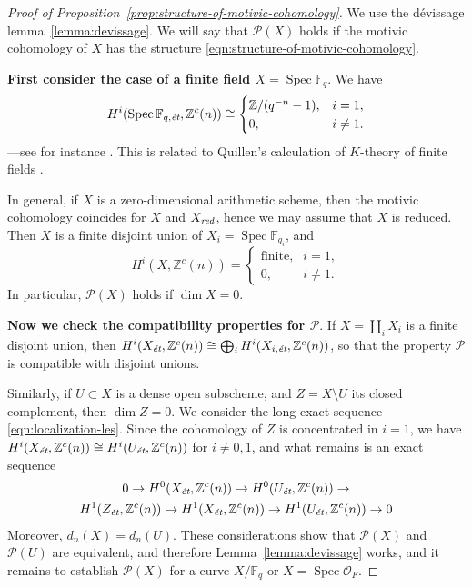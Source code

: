 \documentclass[draft]{article}
\DeclareMathOperator{\Spec}{Spec}
\newcommand{\FF}{\mathbb{F}}
\newcommand{\ZZ}{\mathbb{Z}}
\newcommand{\et}{\text{\it \'{e}t}}
\newcommand{\red}{\text{\it red}}
\theoremstyle{myplain}
\theoremstyle{mydefinition}
\numberwithin{equation}{section}
\begin{document}
\begin{proof}[Proof of Proposition~\ref{prop:structure-of-motivic-cohomology}]
  We use the d\'{e}vissage lemma~\ref{lemma:devissage}. We will say that
  $\mathcal{P} (X)$ holds if the motivic cohomology of $X$ has the structure
  \eqref{eqn:structure-of-motivic-cohomology}.

  \vspace{1em}

  \textbf{First consider the case of a finite field $X = \Spec \FF_q$}.
  We have
  \begin{equation}
    \label{eqn:motivic-cohomology-finite-fields}
    H^i (\Spec \FF_{q,\et}, \ZZ^c (n)) \cong
    \begin{cases}
      \ZZ/(q^{-n} - 1), & i = 1, \\
      0, & i \ne 1.
    \end{cases}
  \end{equation}
  ---see for instance \cite[Example~4.2]{Geisser-2017}. This is related to
  Quillen's calculation of $K$-theory of finite fields \cite{Quillen-1972}.

  In general, if $X$ is a zero-dimensional arithmetic scheme, then the motivic
  cohomology coincides for $X$ and $X_\red$, hence we may assume that $X$ is
  reduced. Then $X$ is a finite disjoint union of $X_i = \Spec \FF_{q_i}$, and
  \begin{equation}
    H^i (X, \ZZ^c (n)) = \begin{cases}
      \text{finite}, & i = 1, \\
      0, & i \ne 1.
    \end{cases}
  \end{equation}
  In particular, $\mathcal{P} (X)$ holds if $\dim X = 0$.

  \vspace{1em}

  \textbf{Now we check the compatibility properties for $\mathcal{P}$}.
  If $X = \coprod_i X_i$ is a finite disjoint union, then
  $H^i (X_\et, \ZZ^c (n)) \cong \bigoplus_i H^i (X_{i,\et}, \ZZ^c (n))$,
  so that the property $\mathcal{P}$ is compatible with disjoint unions.

  Similarly, if $U \subset X$ is a dense open subscheme, and $Z = X\setminus U$
  its closed complement, then $\dim Z = 0$. We consider the long exact sequence
  \eqref{eqn:localization-les}. Since the cohomology of $Z$ is concentrated in
  $i = 1$, we have $H^i (X_\et, \ZZ^c (n)) \cong H^i (U_\et, \ZZ^c (n))$ for
  $i \ne 0,1$, and what remains is an exact sequence
  \begin{multline*}
    0 \to H^0 (X_\et, \ZZ^c (n)) \to
    H^0 (U_\et, \ZZ^c (n)) \to \\
    H^1 (Z_\et, \ZZ^c (n)) \to
    H^1 (X_\et, \ZZ^c (n)) \to
    H^1 (U_\et, \ZZ^c (n)) \to 0
  \end{multline*}
  Moreover, $d_n (X) = d_n (U)$. These considerations show that
  $\mathcal{P} (X)$ and $\mathcal{P} (U)$ are equivalent, and therefore
  Lemma~\ref{lemma:devissage} works, and it remains to establish
  $\mathcal{P} (X)$ for a curve $X/\FF_q$ or $X = \Spec \mathcal{O}_F$.


\end{proof}
\end{document}
